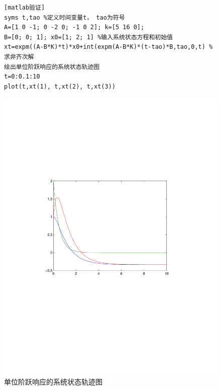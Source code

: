 \documentclass[a4paper]{article}
\begin{document}
\begin{figure}[htbp]
\begin{minipage}[c]{0.45\textwidth}
\begin{verbatim}[matlab验证]
syms t,tao %定义时间变量t， tao为符号
A=[1 0 -1; 0 -2 0; -1 0 2]; k=[5 16 0];
B=[0; 0; 1]; x0=[1; 2; 1] %输入系统状态方程和初始值
xt=expm((A-B*K)*t)*x0+int(expm(A-B*K)*(t-tao)*B,tao,0,t) %求非齐次解
绘出单位阶跃响应的系统状态轨迹图
t=0:0.1:10
plot(t,xt(1), t,xt(2), t,xt(3))
\end{verbatim}
\end{minipage}
\begin{minipage}[c]{0.5\textwidth}
\caption{单位阶跃响应的系统状态轨迹图}
\includegraphics[width=\textwidth]{num6} 
\end{minipage}
\end{figure}
\end{document}
